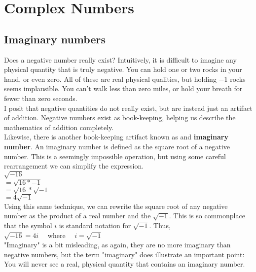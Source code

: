 \section{Complex Numbers}
\label{sec:complex_numbers}

\subsection{Imaginary numbers}

Does a negative number really exist?  Intuitively, it is difficult to imagine any physical quantity that is truly negative.  You can hold one or two rocks in your hand, or even zero.  All of these are real physical qualities, but holding $-1$ rocks seems implausible.  You can't walk less than zero miles, or hold your breath for fewer than zero seconds.\\

I posit that negative quantities do not really exist, but are instead just an artifact of addition.  Negative numbers exist as book-keeping, helping us describe the mathematics of addition completely.\\

Likewise, there is another book-keeping artifact known as and {\bf imaginary number}.  An imaginary number is defined as the square root of a negative number.  This is a seemingly impossible operation, but using some careful rearrangement we can simplify the expression.\\

\tab$\sqrt{-16}$\\

\tab$ = \sqrt{16 * -1}$\\

\tab$ = \sqrt{16} * \sqrt{-1}$\\

\tab$ = 4\sqrt{-1}$\\

Using this same technique, we can rewrite the square root of any negative number as the product of a real number and the $\sqrt{-1}$.  This is so commonplace that the symbol $i$ is standard notation for $\sqrt{-1}$.  Thus, \\

\tab$\sqrt{-16} = 4i$ \ \  where \ \  $i = \sqrt{-1}$\\

"Imaginary" is a bit misleading, as again, they are no more imaginary than negative numbers, but the term "imaginary" does illustrate an important point:  You will never see a real, physical quantity that contains an imaginary number.\\

